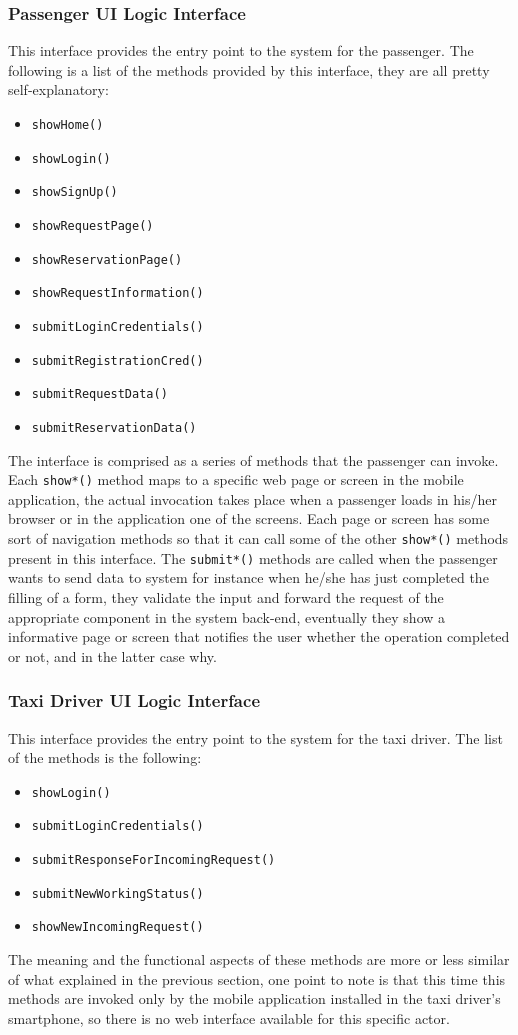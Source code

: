\subsubsection{Passenger UI Logic Interface}
This interface provides the entry point to the system for the passenger. \newline
The following is a list of the methods provided by this interface, they are all pretty self-explanatory:
\begin{itemize}
	\item \texttt{showHome()}
	\item \texttt{showLogin()}
	\item \texttt{showSignUp()}
	\item \texttt{showRequestPage()}
	\item \texttt{showReservationPage()}
	\item \texttt{showRequestInformation()}
	\item \texttt{submitLoginCredentials()}
	\item \texttt{submitRegistrationCred()}
	\item \texttt{submitRequestData()}
	\item \texttt{submitReservationData()}
\end{itemize}
The interface is comprised as a series of methods that the passenger can invoke. Each \texttt{show*()} method maps to a specific web page or screen in the mobile application, the actual invocation takes place when a passenger loads in his/her browser or in the application one of the screens. Each page or screen has some sort of navigation methods so that it can call some of the other \texttt{show*()} methods present in this interface. \newline
The \texttt{submit*()} methods are called when the passenger wants to send data to system for instance when he/she has just completed the filling of a form, they validate the input and forward the request of the appropriate component in the system back-end, eventually they show a informative page or screen that notifies the user whether the operation completed or not, and in the latter case why. 
\subsubsection{Taxi Driver UI Logic Interface}
This interface provides the entry point to the system for the taxi driver.
The list of the methods is the following:
\begin{itemize}
	\item \texttt{showLogin()}
	\item \texttt{submitLoginCredentials()}
	\item \texttt{submitResponseForIncomingRequest()}
	\item \texttt{submitNewWorkingStatus()}
	\item \texttt{showNewIncomingRequest()}
\end{itemize}
The meaning and the functional aspects of these methods are more or less similar of what explained in the previous section, one point to note is that this time this methods are invoked only by the mobile application installed in the taxi driver's smartphone, so there is no web interface available for this specific actor.
